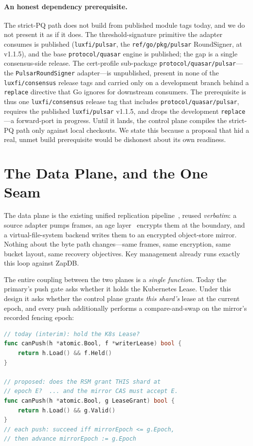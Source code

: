 \documentclass[11pt]{article}
\begin{document}
\paragraph{An honest dependency prerequisite.}
The strict-PQ path does not build from published module tags today, and we do
not present it as if it does. The threshold-signature primitive the adapter
consumes is published (\texttt{luxfi/pulsar}, the \texttt{ref/go/pkg/pulsar}
RoundSigner, at v1.1.5), and the base \texttt{protocol/quasar} engine is
published; the gap is a single consensus-side release. The cert-profile
sub-package \texttt{protocol/quasar/pulsar}---the \texttt{PulsarRoundSigner}
adapter---is unpublished, present in none of the \texttt{luxfi/consensus}
release tags and carried only on a development branch behind a \texttt{replace}
directive that Go ignores for downstream consumers. The prerequisite is thus
one \texttt{luxfi/consensus} release tag that includes
\texttt{protocol/quasar/pulsar}, requires the published \texttt{luxfi/pulsar}
v1.1.5, and drops the development \texttt{replace}---a forward-port in
progress. Until it lands, the control plane compiles the strict-PQ path only
against local checkouts. We state this because a proposal that hid a real,
unmet build prerequisite would be dishonest about its own readiness.

\section{The Data Plane, and the One Seam}
\label{sec:seam}

The data plane is the existing unified replication pipeline~\cite{hip0107},
reused \emph{verbatim}: a source adapter pumps frames, an age
layer~\cite{age} encrypts them at the boundary, and a virtual-file-system
backend writes them to an encrypted object-store mirror. Nothing about the
byte path changes---same frames, same encryption, same bucket layout, same
recovery objectives. Key management already runs exactly this loop against
ZapDB.

The entire coupling between the two planes is a \emph{single function}. Today
the primary's push gate asks whether it holds the Kubernetes Lease. Under
this design it asks whether the control plane grants \emph{this shard's} lease
at the current epoch, and every push additionally performs a compare-and-swap
on the mirror's recorded fencing epoch:

\begin{lstlisting}[language=Go]
// today (interim): hold the K8s Lease?
func canPush(h *atomic.Bool, f *writerLease) bool {
    return h.Load() && f.Held()
}

// proposed: does the RSM grant THIS shard at
// epoch E?  ... and the mirror CAS must accept E.
func canPush(h *atomic.Bool, g LeaseGrant) bool {
    return h.Load() && g.Valid()
}
// each push: succeed iff mirrorEpoch <= g.Epoch,
// then advance mirrorEpoch := g.Epoch
\end{lstlisting}
\end{document}

